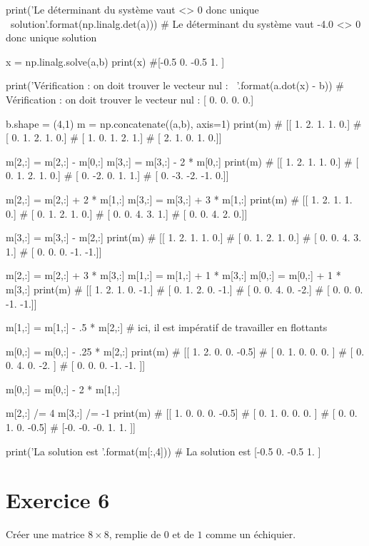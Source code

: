 \documentclass[10pt,fleqn]{article} %
\begin{document}
\begin{multicols}{2}
\begin{corrige}
\begin{python}
print('Le déterminant du système vaut {} <> 0 donc unique \
solution'.format(np.linalg.det(a)))
# Le déterminant du système vaut -4.0 <> 0 donc unique solution

x = np.linalg.solve(a,b)
print(x)
#[-0.5  0.  -0.5  1. ]

print('Vérification : on doit trouver le vecteur nul : \
{}'.format(a.dot(x) - b))
# Vérification : on doit trouver le vecteur nul : [ 0.  0.  0.  0.]

b.shape = (4,1)
m = np.concatenate((a,b), axis=1)
print(m)
# [[ 1.  2.  1.  1.  0.]
#  [ 0.  1.  2.  1.  0.]
#  [ 1.  0.  1.  2.  1.]
#  [ 2.  1.  0.  1.  0.]]

m[2,:] = m[2,:] - m[0,:]
m[3,:] = m[3,:] - 2 * m[0,:]
print(m)
# [[ 1.  2.  1.  1.  0.]
#  [ 0.  1.  2.  1.  0.]
#  [ 0. -2.  0.  1.  1.]
#  [ 0. -3. -2. -1.  0.]]

m[2,:] = m[2,:] + 2 * m[1,:]
m[3,:] = m[3,:] + 3 * m[1,:]
print(m)
# [[ 1.  2.  1.  1.  0.]
#  [ 0.  1.  2.  1.  0.]
#  [ 0.  0.  4.  3.  1.]
#  [ 0.  0.  4.  2.  0.]]

m[3,:] = m[3,:] - m[2,:]
print(m)
# [[ 1.  2.  1.  1.  0.]
#  [ 0.  1.  2.  1.  0.]
#  [ 0.  0.  4.  3.  1.]
#  [ 0.  0.  0. -1. -1.]]

m[2,:] = m[2,:] + 3 * m[3,:]
m[1,:] = m[1,:] + 1 * m[3,:]
m[0,:] = m[0,:] + 1 * m[3,:]
print(m)
# [[ 1.  2.  1.  0. -1.]
#  [ 0.  1.  2.  0. -1.]
#  [ 0.  0.  4.  0. -2.]
#  [ 0.  0.  0. -1. -1.]]

m[1,:] = m[1,:] - .5 * m[2,:]
# ici, il est impératif de travailler en flottants

m[0,:] = m[0,:] - .25 * m[2,:]
print(m)
# [[ 1.   2.   0.   0.  -0.5]
#  [ 0.   1.   0.   0.   0. ]
#  [ 0.   0.   4.   0.  -2. ]
#  [ 0.   0.   0.  -1.  -1. ]]

m[0,:] = m[0,:] - 2 * m[1,:]

m[2,:] /= 4
m[3,:] /= -1
print(m)
# [[ 1.   0.   0.   0.  -0.5]
#  [ 0.   1.   0.   0.   0. ]
#  [ 0.   0.   1.   0.  -0.5]
#  [-0.  -0.  -0.   1.   1. ]]

print('La solution est {}'.format(m[:,4]))
# La solution est [-0.5  0.  -0.5  1. ]


\end{python}
\end{corrige}
\else
\fi


\section*{Exercice  6}
Créer une matrice $8\times 8$, remplie de $0$ et de $1$ comme un
échiquier.


\end{multicols}
\end{document}
